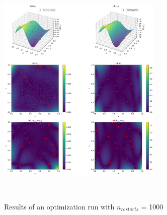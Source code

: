 \documentclass{article}
\begin{document}
\begin{figure}
    \centering
    \includegraphics[width=0.7\textwidth]{../final_examples/heat_equation/merged_plots.png}
    \caption{Results of an optimization run with $n_{restarts}$ = 1000}
    ~\label{fig:results_optrun}
\end{figure}
\newpage 
\end{document}
